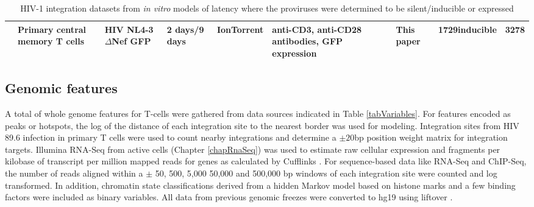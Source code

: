 \documentclass[../sherrill-Mix_thesis.tex]{subfiles}
\begin{document}
\begin{table}
{\begin{tabular}{|p{0.49in}|p{0.53in}|p{0.8in}|P{0.6in}|p{0.6in}|P{0.75in}|P{0.59in}|p{0.59in}|p{0.6in}|}
			\hline     
			\Memory{}         & Primary central memory \cdFour{} T cells             & HIV NL4-3 $\Delta$Nef GFP                                                                      & 2 days/9 days                            & Ion\-Torrent                 & anti-CD3, anti-CD28 antibodies, GFP expression         & This paper           &  1729\newline inducible                                   & 3278                                \\ 
			\hline
		\end{tabular}
	}
	\caption[Integrations from \textit{in vitro} models of latency]{HIV-1 integration datasets from \textit{in vitro} models of latency where the proviruses were determined to be silent/inducible or expressed}
	\label{tabLatencySamples}
	\end{table}

	\subsection{Genomic features}
		A total of \nFeatures{} whole genome features for \cdFour{} T-cells were gathered from data sources indicated in Table \ref{tabVariables}.  For features encoded as peaks or hotspots, the log of the distance of each integration site to the nearest border was used for modeling. Integration sites from HIV 89.6 infection in primary \cdFour{} T cells \citep{Berry2014} were used to count nearby integrations and determine a $\pm20$bp position weight matrix for integration targets. Illumina RNA-Seq from active \cdFour{} cells (Chapter \ref{chapRnaSeq}) was used to estimate raw cellular expression and fragments per kilobase of transcript per million mapped reads for genes as calculated by Cufflinks \citep{Trapnell2010}. For sequence-based data like RNA-Seq and ChIP-Seq, the number of reads aligned within a $\pm$ 50, 500, 5,000 50,000 and 500,000 bp windows of each integration site were counted and log transformed. In addition, chromatin state classifications derived from a hidden Markov model based on histone marks and a few binding factors \citep{Ernst2010} were included as binary variables. All data from previous genomic freezes were converted to hg19 using liftover \citep{Hinrichs2006}. 
\end{document}
